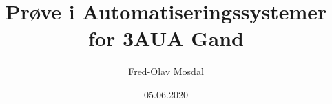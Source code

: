 \title {Prøve i  Automatiseringssystemer for 3AUA Gand} 
\author {Fred-Olav Mosdal} 
\date {05.06.2020}
\maketitle
